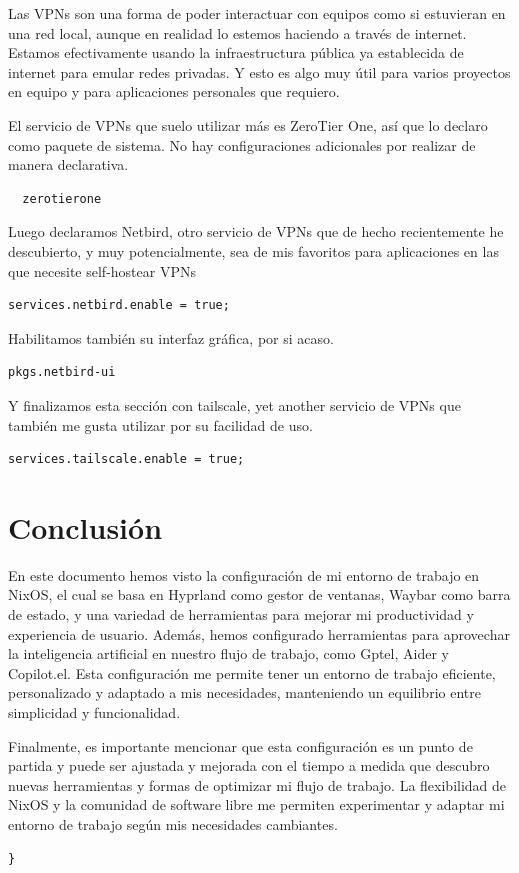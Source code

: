 \documentclass[11pt]{article}
\begin{document}
Las VPNs son una forma de poder interactuar con equipos como si estuvieran en una red local, aunque en realidad lo estemos haciendo a través de internet. Estamos efectivamente usando la infraestructura pública ya establecida de internet para emular redes privadas. Y esto es algo muy útil para varios proyectos en equipo y para aplicaciones personales que requiero.

El servicio de VPNs que suelo utilizar más es ZeroTier One, así que lo declaro como paquete de sistema. No hay configuraciones adicionales por realizar de manera declarativa.

\begin{verbatim}
  zerotierone
\end{verbatim}

Luego declaramos Netbird, otro servicio de VPNs que de hecho recientemente he descubierto, y muy potencialmente, sea de mis favoritos para aplicaciones en las que necesite self-hostear VPNs

\begin{verbatim}
services.netbird.enable = true;
\end{verbatim}

Habilitamos también su interfaz gráfica, por si acaso.

\begin{verbatim}
pkgs.netbird-ui
\end{verbatim}

Y finalizamos esta sección con tailscale, yet another servicio de VPNs que también me gusta utilizar por su facilidad de uso.

\begin{verbatim}
services.tailscale.enable = true;
\end{verbatim}
\section{Conclusión}
\label{sec:orge9f8168}

En este documento hemos visto la configuración de mi entorno de trabajo en NixOS, el cual se basa en Hyprland como gestor de ventanas, Waybar como barra de estado, y una variedad de herramientas para mejorar mi productividad y experiencia de usuario. Además, hemos configurado herramientas para aprovechar la inteligencia artificial en nuestro flujo de trabajo, como Gptel, Aider y Copilot.el. Esta configuración me permite tener un entorno de trabajo eficiente, personalizado y adaptado a mis necesidades, manteniendo un equilibrio entre simplicidad y funcionalidad.

Finalmente, es importante mencionar que esta configuración es un punto de partida y puede ser ajustada y mejorada con el tiempo a medida que descubro nuevas herramientas y formas de optimizar mi flujo de trabajo. La flexibilidad de NixOS y la comunidad de software libre me permiten experimentar y adaptar mi entorno de trabajo según mis necesidades cambiantes.

\begin{verbatim}
}
\end{verbatim}
\end{document}
